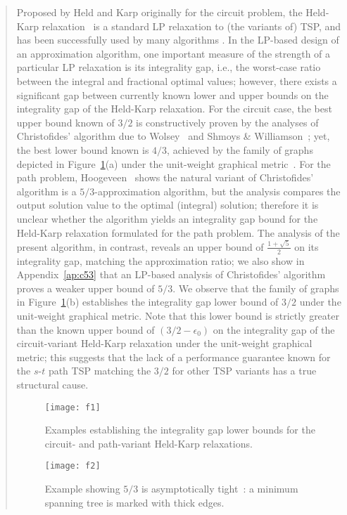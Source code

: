 \documentclass[11pt,letterpaper]{article}
\newcommand{\st}{\mbox{$s$-$t$} }
\begin{document}
\begin{quote}
Proposed by Held and Karp \cite{HK} originally for the circuit problem, the Held-Karp relaxation~\cite{HK} is a standard LP relaxation to (the variants of) TSP, and has been successfully used by many algorithms \cite{BGSW, G:pc, AGMOS, AKS, OSS, MS, M}. In the LP-based design of an approximation algorithm, one important measure of the strength of a particular LP relaxation is its integrality gap, i.e., the worst-case ratio between the integral and fractional optimal values; however, there exists a significant gap between currently known lower and upper bounds on the integrality gap of the Held-Karp relaxation. For the circuit case, the best upper bound known of $3/2$ is constructively proven by the analyses of Christofides' algorithm due to Wolsey~\cite{W} and Shmoys \& Williamson~\cite{SW}; yet, the best lower bound known is $4/3$, achieved by the family of graphs depicted in Figure~\ref{f:ig}(a) under the unit-weight graphical metric~\cite{G:ineq}. For the path problem, Hoogeveen~\cite{H} shows the natural variant of Christofides' algorithm is a $5/3$-approximation algorithm, but the analysis compares the output solution value to the optimal (integral) solution; therefore it is unclear whether the algorithm yields an integrality gap bound for the Held-Karp relaxation formulated for the path problem. The analysis of the present algorithm, in contrast, reveals an upper bound of $\frac{1+\sqrt{5}}{2}$ on its integrality gap, matching the approximation ratio; we also show in Appendix~\ref{ap:c53} that an LP-based analysis of Christofides' algorithm proves a weaker upper bound of $5/3$. We observe that the family of graphs in Figure~\mbox{\ref{f:ig}(b)} establishes the integrality gap lower bound of $3/2$ under the unit-weight graphical metric. Note that this lower bound is strictly greater than the known upper bound of $(3/2-\epsilon_0)$ on the integrality gap of the circuit-variant Held-Karp relaxation under the unit-weight graphical metric; this suggests that the lack of a performance guarantee known for the \st path TSP matching the $3/2$ for other TSP variants has a true structural cause.

\begin{figure}
\center
\texttt{[image: f1]}
\caption{Examples establishing the integrality gap lower bounds for the circuit- and path-variant Held-Karp relaxations.}
\label{f:ig}
\end{figure}
\begin{figure}
\center
\texttt{[image: f2]}
\caption{Example showing $5/3$ is asymptotically tight~\cite{H}: a minimum spanning tree is marked with thick edges.}
\label{f:53ex}
\end{figure}


\end{quote}
\end{document}
